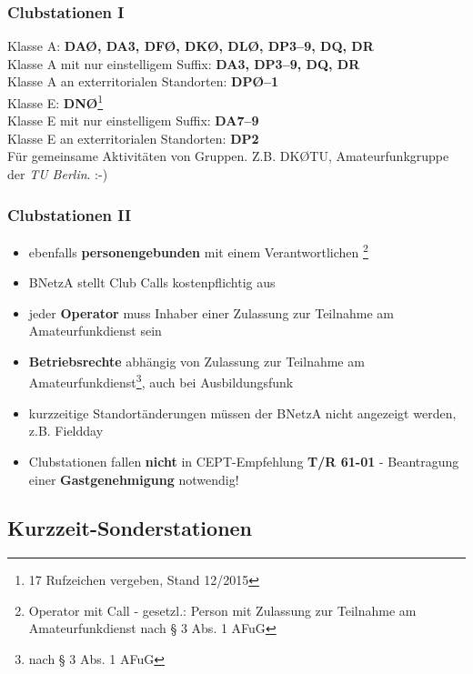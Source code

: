 \begin{frame}
    \frametitle{Clubstationen I}

    Klasse A: \textbf{DAØ, DA3, DFØ, DKØ, DLØ, DP3--9, DQ, DR} \\
    Klasse A mit nur einstelligem Suffix: \textbf{DA3, DP3--9, DQ, DR} \\
    Klasse A an exterritorialen Standorten: \textbf{DPØ--1} \\[1.5em]
    Klasse E: \textbf{DNØ}\footnote{17 Rufzeichen vergeben, Stand 12/2015} \\
    Klasse E mit nur einstelligem Suffix: \textbf{DA7--9}\\
    Klasse E an exterritorialen Standorten: \textbf{DP2} \\[2em]

    Für gemeinsame Aktivitäten von Gruppen. Z.B. DKØTU, Amateurfunkgruppe der
    \emph{TU Berlin}. :-)

\end{frame}

\begin{frame}
    \frametitle{Clubstationen II}

    \begin{itemize}[<+->]
        \item ebenfalls \textbf{personengebunden} mit einem Verantwortlichen
              \footnote{Operator mit Call - gesetzl.: Person mit Zulassung zur
              Teilnahme am Amateurfunkdienst nach § 3 Abs. 1 AFuG}
        \item BNetzA stellt Club Calls kostenpflichtig aus
        \item jeder \textbf{Operator} muss Inhaber einer Zulassung zur Teilnahme am
              Amateurfunkdienst sein
        \item \textbf{Betriebsrechte} abhängig von Zulassung zur Teilnahme am
              Amateurfunkdienst\footnote{nach § 3 Abs. 1 AFuG}, auch bei Ausbildungsfunk
        \item kurzzeitige Standortänderungen müssen der BNetzA nicht angezeigt
              werden, z.B. Fieldday
        \item Clubstationen fallen \textbf{nicht} in CEPT-Empfehlung \textbf{T/R
              61-01} - Beantragung einer \textbf{Gastgenehmigung} notwendig!
    \end{itemize}

\end{frame}

\subsection{Kurzzeit-Sonderstationen}

